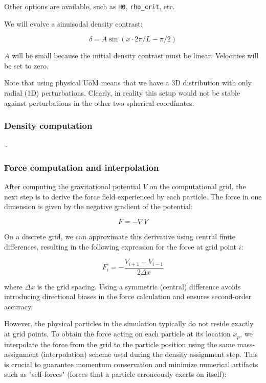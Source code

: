 Other options are available, such as \texttt{H0}, \texttt{rho\_crit}, etc.

We will evolve a sinuisodal density contrast:

$$
\delta = A \sin(x \cdot 2\pi / L - \pi / 2)
$$

$A$ will be small because the initial density contrast must be linear. Velocities will be set to zero.

Note that using physical UoM means that we have a 3D distribution with only radial (1D) perturbations. Clearly, in reality this setup would not be stable against perturbations in the other two spherical coordinates.

\subsubsection{Density computation}



\dots

\subsubsection{Force computation and interpolation}

After computing the gravitational potential $V$ on the computational grid, the next step is to derive the force field experienced by each particle. The force in one dimension is given by the negative gradient of the potential:

$$
F = -\nabla V
$$

On a discrete grid, we can approximate this derivative using central finite differences, resulting in the following expression for the force at grid point $i$:

$$
F_i = -\frac{V_{i+1} - V_{i-1}}{2\Delta x}
$$

where $\Delta x$ is the grid spacing. Using a symmetric (central) difference avoids introducing directional biases in the force calculation and ensures second-order accuracy.

However, the physical particles in the simulation typically do not reside exactly at grid points. To obtain the force acting on each particle at its location $x_p$, we interpolate the force from the grid to the particle position using the same mass-assignment (interpolation) scheme used during the density assignment step. This is crucial to guarantee momentum conservation and minimize numerical artifacts such as "self-forces" (forces that a particle erroneously exerts on itself):

